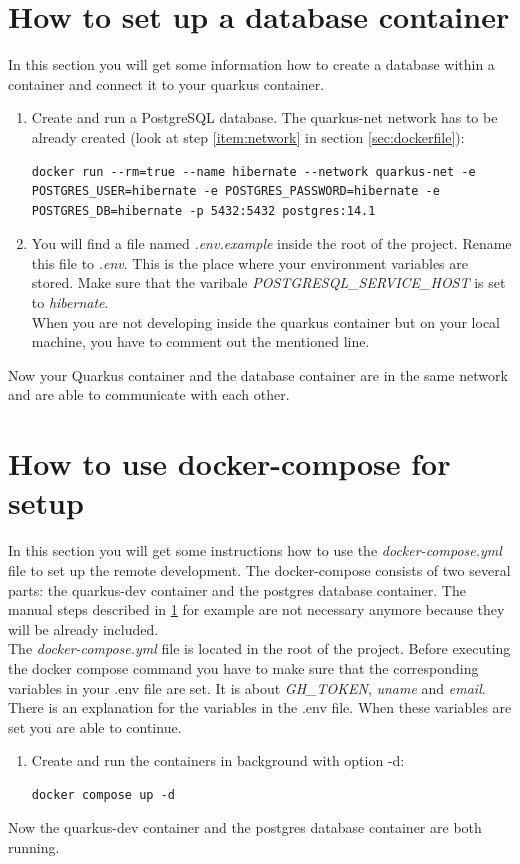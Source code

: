     \section{How to set up a database container}\label{sec:database}
        In this section you will get some information how to create a database within a container and connect it to your quarkus container.  
        \begin{enumerate}
            \item Create and run a PostgreSQL database. The quarkus-net network has to be already created (look at step \ref{item:network} in section \ref{sec:dockerfile}):
            \begin{lstlisting}[style=bash]
docker run --rm=true --name hibernate --network quarkus-net -e POSTGRES_USER=hibernate -e POSTGRES_PASSWORD=hibernate -e POSTGRES_DB=hibernate -p 5432:5432 postgres:14.1
            \end{lstlisting}
            \item You will find a file named \textit{.env.example} inside the root of the project. Rename this file to \textit{.env}. This is the place where your environment variables are stored. Make sure that the varibale \textit{POSTGRESQL\_SERVICE\_HOST} is set to \textit{hibernate}. \\
            When you are not developing inside the quarkus container but on your local machine, you have to comment out the mentioned line. 
        \end{enumerate}
        Now your Quarkus container and the database container are in the same network and are able to communicate with each other. 
    
    \section{How to use docker-compose for setup}\label{sec:docker-compose}
        In this section you will get some instructions how to use the \textit{docker-compose.yml} file to set up the remote development. The docker-compose consists of two several parts: the quarkus-dev container and the postgres database container. The manual steps described in \ref{sec:database} for example are not necessary anymore because they will be already included. \\
        The \textit{docker-compose.yml} file is located in the root of the project. Before executing the docker compose command you have to make sure that the corresponding variables in your .env file are set. It is about \textit{GH\_TOKEN}, \textit{uname} and \textit{email}. There is an explanation for the variables in the .env file. When these variables are set you are able to continue.
        \begin{enumerate}
            \item Create and run the containers in background with option -d:
            \begin{lstlisting}[style=bash]
docker compose up -d
            \end{lstlisting}
        \end{enumerate}
        Now the quarkus-dev container and the postgres database container are both running. 
            
